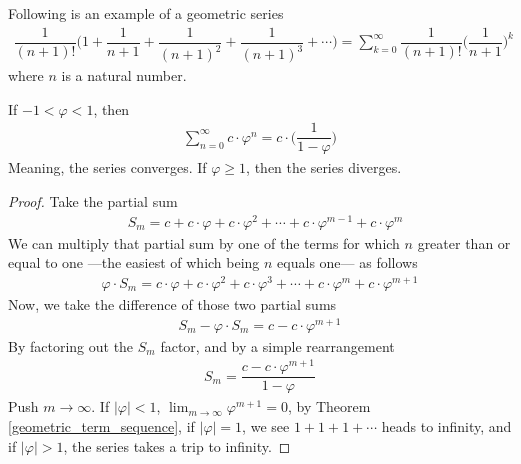 \begin{example}
Following is an example of a geometric series
\begin{align*}
    \dfrac{1}{(n+1)!} \Big( 1 + \dfrac{1}{n+1} + \dfrac{1}{(n+1)^{2}} + \dfrac{1}{(n+1)^{3}} + \cdots \Big) = \sum_{k = 0}^{\infty} \dfrac{1}{(n+1)!} \Big( \dfrac{1}{n+1} \Big)^{k}
\end{align*}
where $n$ is a natural number.
\end{example}

\begin{theorem}
If $-1 < \varphi < 1$, then
\begin{align*}
    \sum_{n = 0}^{\infty} c \cdot \varphi^{n} = c \cdot \Big(\dfrac{1}{1 - \varphi}\Big)
\end{align*}
Meaning, the series converges. If $\varphi \geq 1$, then the series diverges.
\begin{proof}
Take the partial sum
\begin{align*}
    &S_{m} = c + c \cdot \varphi + c \cdot \varphi^{2} + \cdots + c \cdot \varphi^{m-1} + c \cdot \varphi^{m}
\end{align*}
We can multiply that partial sum by one of the terms for which $n$ greater than or equal to one ---the easiest of which being $n$ equals one--- as follows
\begin{align*}    
    \varphi \cdot S_{m} = c \cdot \varphi + c \cdot \varphi^{2} + c \cdot \varphi^{3} + \cdots + c \cdot \varphi^{m} + c \cdot \varphi^{m+1}
\end{align*}
Now, we take the difference of those two partial sums
\begin{align*}
    S_{m} - \varphi \cdot S_{m} = c - c \cdot \varphi^{m+1}
\end{align*}
By factoring out the $S_{m}$ factor, and by a simple rearrangement
\begin{align*}
    S_{m} = \dfrac{c - c \cdot \varphi^{m + 1}}{1 - \varphi}
\end{align*}
Push $m \longrightarrow \infty$. If $\lvert \varphi \rvert < 1$, $\lim_{m \longrightarrow \infty} \varphi^{m+1} = 0$, by Theorem \ref{geometric_term_sequence}, if $\lvert \varphi \rvert = 1$, we see $1 + 1 + 1 + \cdots$ heads to infinity, and if $\lvert \varphi \rvert > 1$, the series takes a trip to infinity. 
\end{proof}
\end{theorem}


